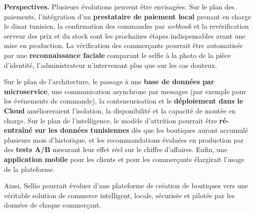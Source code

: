 \textbf{Perspectives.} Plusieurs évolutions peuvent être envisagées. Sur le plan des paiements, l'intégration d'un \textbf{prestataire de paiement local} prenant en charge le dinar tunisien, la confirmation des commandes par \textit{webhook} et la revérification serveur des prix et du stock sont les prochaines étapes indispensables avant une mise en production. La vérification des commerçants pourrait être automatisée par une \textbf{reconnaissance faciale} comparant le selfie à la photo de la pièce d'identité, l'administrateur n'intervenant plus que sur les cas douteux.

Sur le plan de l'architecture, le passage à une \textbf{base de données par microservice}, une communication asynchrone par messages (par exemple pour les événements de commande), la conteneurisation et le \textbf{déploiement dans le Cloud} amélioreraient l'isolation, la disponibilité et la capacité de montée en charge. Sur le plan de l'intelligence, le modèle d'attrition pourrait être \textbf{ré-entraîné sur les données tunisiennes} dès que les boutiques auront accumulé plusieurs mois d'historique, et les recommandations évaluées en production par des \textbf{tests A/B} mesurant leur effet réel sur le chiffre d'affaires. Enfin, une \textbf{application mobile} pour les clients et pour les commerçants élargirait l'usage de la plateforme.

Ainsi, Sellio pourrait évoluer d'une plateforme de création de boutiques vers une véritable solution de commerce intelligent, locale, sécurisée et pilotée par les données de chaque commerçant.
